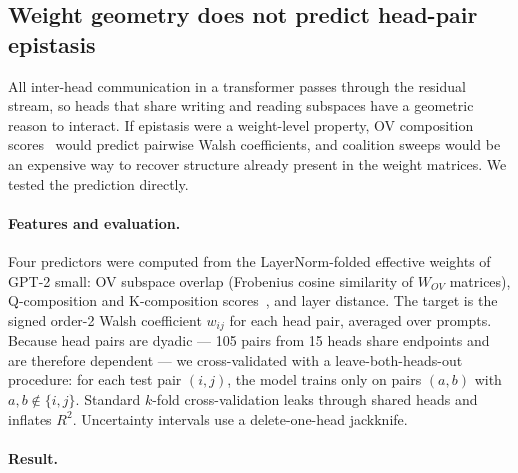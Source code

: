 %
%

\subsection{Weight geometry does not predict head-pair epistasis}
\label{sec:weight-geometry}

All inter-head communication in a transformer passes through the residual
stream, so heads that share writing and reading subspaces have a geometric
reason to interact. If epistasis were a weight-level property, OV composition
scores~\citep{elhage2021mathematical} would predict pairwise Walsh
coefficients, and coalition sweeps would be an expensive way to recover
structure already present in the weight matrices. We tested the prediction directly.

\paragraph{Features and evaluation.}

Four predictors were computed from the LayerNorm-folded effective
weights of GPT-2 small: OV subspace overlap (Frobenius cosine similarity
of $W_{OV}$ matrices), Q-composition and K-composition
scores~\citep{elhage2021mathematical}, and layer distance. The target is
the signed order-2 Walsh coefficient $w_{ij}$ for each head pair, averaged
over prompts. Because head pairs are dyadic --- 105 pairs from 15 heads
share endpoints and are therefore dependent --- we cross-validated with a
leave-both-heads-out procedure: for each test pair $(i,j)$, the model
trains only on pairs $(a,b)$ with $a,b \notin \{i,j\}$. Standard
$k$-fold cross-validation leaks through shared heads and inflates
$R^2$. Uncertainty intervals use a delete-one-head jackknife.

\paragraph{Result.}

